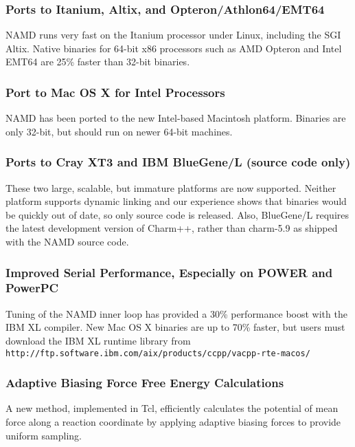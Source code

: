 \subsubsection*{Ports to Itanium, Altix, and Opteron/Athlon64/EMT64}

NAMD runs very fast on the Itanium processor under Linux, including
the SGI Altix.  Native binaries for 64-bit x86 processors such as
AMD Opteron and Intel EMT64 are 25\% faster than 32-bit binaries.

\subsubsection*{Port to Mac OS X for Intel Processors}

NAMD has been ported to the new Intel-based Macintosh platform.
Binaries are only 32-bit, but should run on newer 64-bit machines.

\subsubsection*{Ports to Cray XT3 and IBM BlueGene/L (source code only)}

These two large, scalable, but immature platforms are now
supported.  Neither platform supports dynamic linking and our
experience shows that binaries would be quickly out of date, so
only source code is released.  Also, BlueGene/L requires the
latest development version of Charm++, rather than charm-5.9
as shipped with the NAMD source code.

\subsubsection*{Improved Serial Performance, Especially on POWER and PowerPC}

Tuning of the NAMD inner loop has provided a 30\% performance boost
with the IBM XL compiler.  New Mac OS X binaries are up to 70\%
faster, but users must download the IBM XL runtime library from
{\tt http://ftp.software.ibm.com/aix/products/ccpp/vacpp-rte-macos/}

\subsubsection*{Adaptive Biasing Force Free Energy Calculations}

A new method, implemented in Tcl, efficiently calculates the
potential of mean force along a reaction coordinate by applying
adaptive biasing forces to provide uniform sampling.

